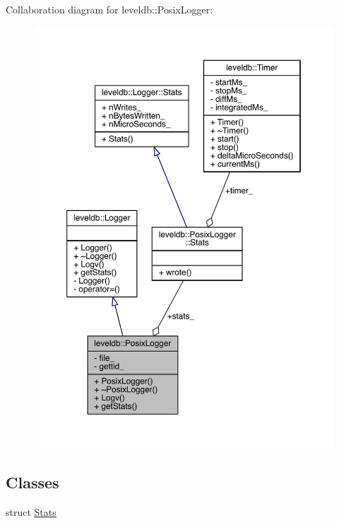 Collaboration diagram for leveldb\+:\+:Posix\+Logger\+:
\nopagebreak
\begin{figure}[H]
\begin{center}
\leavevmode
\includegraphics[width=350pt]{classleveldb_1_1_posix_logger__coll__graph}
\end{center}
\end{figure}
\subsection*{Classes}
\begin{DoxyCompactItemize}
\item 
struct \hyperlink{structleveldb_1_1_posix_logger_1_1_stats}{Stats}
\end{DoxyCompactItemize}

